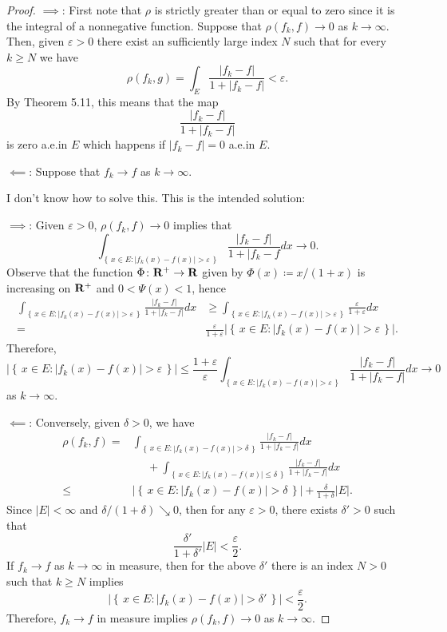 \begin{proof}
$\implies$: First note that $\rho$ is strictly greater than or equal to
zero since it is the integral of a nonnegative function. Suppose that
$\rho(f_k,f)\to 0$ as $k\to\infty$. Then, given $\varepsilon>0$ there exist
an sufficiently large index $N$ such that for every $k\geq N$ we have
\begin{equation}
\label{eq:hypothesis-4}
\rho(f_k,g)=\int_E\frac{|f_k-f|}{1+|f_k-f|}<\varepsilon.
\end{equation}
By Theorem 5.11, this means that the map
\[
\frac{|f_k-f|}{1+|f_k-f|}
\]
is zero a.e.\@ in $E$ which happens if $|f_k-f|=0$ a.e.\@ in $E$.

$\impliedby$: Suppose that $f_k\to f$ as $k\to\infty$.

\bigskip

I don't know how to solve this. This is the intended solution:

$\implies$: Given $\varepsilon>0$, $\rho(f_k,f)\to 0$ implies that
\[
\int_{\left\{\,x\in
    E:|f_k(x)-f(x)|>\varepsilon\,\right\}}\frac{|f_k-f|}{1+|f_k-f} d
x\longrightarrow 0.
\]
Observe that the function $\Phi\colon\mathbf{R}^+\to\mathbf{R}$ given by
$\Phi(x)\coloneqq x/(1+x)$ is increasing on $\mathbf{R}^+$ and $0<\Psi(x)<1$,
hence
\[
\begin{aligned}
  \int_{\left\{\,x\in
      E:|f_k(x)-f(x)|>\varepsilon\,\right\}}\frac{|f_k-f|}{1+|f_k-f|} d
  x
&\geq\int_{\left\{\,x\in
    E:|f_k(x)-f(x)|>\varepsilon\,\right\}}\frac{\varepsilon}{1+\varepsilon} d
x\\
={}&\frac{\varepsilon}{1+\varepsilon}
\left|\left\{\,x\in E:|f_k(x)-f(x)|>\varepsilon\,\right\}\right|.
\end{aligned}
\]
Therefore,
\[
\left|\left\{\,x\in E:|f_k(x)-f(x)|>\varepsilon\,\right\}\right|
\leq\frac{1+\varepsilon}{\varepsilon}
\int_{\left\{\,x\in
    E:|f_k(x)-f(x)|>\varepsilon\,\right\}}\frac{|f_k-f|}{1+|f_k-f|} d  x
\longrightarrow 0
\]
as $k\to\infty$.

$\impliedby$: Conversely, given $\delta>0$, we have
\[
\begin{aligned}
\rho(f_k,f)
={}&\int_{\left\{\,x\in E:|f_k(x)-f(x)|>\delta\,\right\}}\frac{|f_k-f|}{1+|f_k-f|} d  x\\
&\phantom{{}={}}+\int_{\left\{\,x\in
    E:|f_k(x)-f(x)|\leq\delta\,\right\}}\frac{|f_k-f|}{1+|f_k-f|} d  x\\
\leq{}&\left|\left\{\,x\in
    E:|f_k(x)-f(x)|>\delta\,\right\}\right|+\frac{\delta}{1+\delta}|E|.
\end{aligned}
\]
Since $|E|<\infty$ and $\delta/(1+\delta)\searrow 0$, then for any
$\varepsilon>0$, there exists $\delta'>0$ such that
\[
\frac{\delta'}{1+\delta'}|E|<\frac{\varepsilon}{2}.
\]
If $f_k\to f$ as $k\to\infty$ in measure, then for the above $\delta'$
there is an index $N>0$ such that $k\geq N$ implies
\[
\left|\left\{\,x\in E:|f_k(x)-f(x)|>\delta'\,\right\}\right|<\frac{\varepsilon}{2}.
\]
Therefore, $f_k\to f$ in measure implies $\rho(f_k,f)\to 0$ as $k\to\infty$.
\end{proof}


